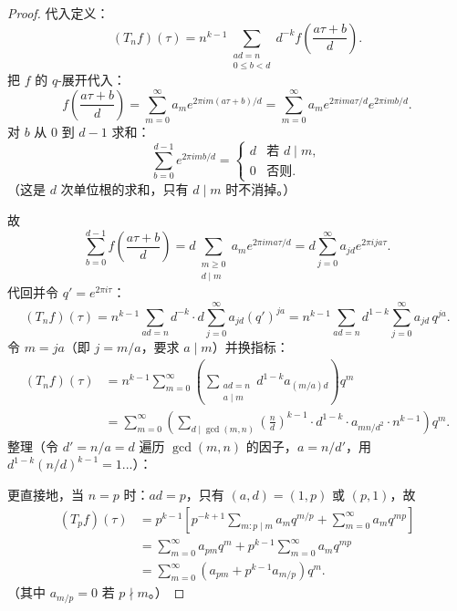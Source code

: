 \begin{proof}
代入定义：
\[
  (T_n f)(\tau)
  = n^{k-1} \sum_{\substack{ad=n \\ 0 \leq b < d}} d^{-k}
    f\!\left(\frac{a\tau + b}{d}\right).
\]
把 $f$ 的 $q$-展开代入：
\[
  f\!\left(\frac{a\tau+b}{d}\right)
  = \sum_{m=0}^{\infty} a_m e^{2\pi im(a\tau+b)/d}
  = \sum_{m=0}^{\infty} a_m e^{2\pi ima\tau/d} e^{2\pi imb/d}.
\]
对 $b$ 从 $0$ 到 $d-1$ 求和：
\[
  \sum_{b=0}^{d-1} e^{2\pi imb/d}
  = \begin{cases} d & \text{若 } d \mid m, \\ 0 & \text{否则.} \end{cases}
\]
（这是 $d$ 次单位根的求和，只有 $d \mid m$ 时不消掉。）

故
\[
  \sum_{b=0}^{d-1} f\!\left(\frac{a\tau+b}{d}\right)
  = d \sum_{\substack{m \geq 0 \\ d \mid m}} a_m e^{2\pi ima\tau/d}
  = d \sum_{j=0}^{\infty} a_{jd} e^{2\pi ija\tau}.
\]
代回并令 $q' = e^{2\pi i\tau}$：
\[
  (T_n f)(\tau)
  = n^{k-1} \sum_{ad=n} d^{-k} \cdot d \sum_{j=0}^{\infty} a_{jd} (q')^{ja}
  = n^{k-1} \sum_{ad=n} d^{1-k} \sum_{j=0}^{\infty} a_{jd}\, q^{ja}.
\]
令 $m = ja$（即 $j = m/a$，要求 $a \mid m$）并换指标：
\begin{align}
  (T_n f)(\tau)
  &= n^{k-1} \sum_{m=0}^{\infty}
    \left(\sum_{\substack{ad=n \\ a \mid m}} d^{1-k} a_{(m/a)d}\right) q^m \\
  &= \sum_{m=0}^{\infty}
    \left(\sum_{d \mid \gcd(m,n)} \left(\frac{n}{d}\right)^{k-1} \cdot d^{1-k} \cdot a_{mn/d^2} \cdot n^{k-1}\right) q^m.
\end{align}
整理（令 $d' = n/a = d$ 遍历 $\gcd(m,n)$ 的因子，$a = n/d'$，用 $d^{1-k}(n/d)^{k-1} = 1$...）：

更直接地，当 $n = p$ 时：$ad = p$，只有 $(a,d) = (1,p)$ 或 $(p,1)$，故
\begin{align}
  (T_p f)(\tau)
  &= p^{k-1} \left[
    p^{-k+1} \sum_{m: p\mid m} a_m q^{m/p}
    + \sum_{m=0}^\infty a_m q^{mp}
  \right] \\
  &= \sum_{m=0}^\infty a_{pm} q^m + p^{k-1}\sum_{m=0}^\infty a_m q^{mp} \\
  &= \sum_{m=0}^\infty \left(a_{pm} + p^{k-1} a_{m/p}\right) q^m.
\end{align}
（其中 $a_{m/p} = 0$ 若 $p \nmid m$。）
\end{proof}

